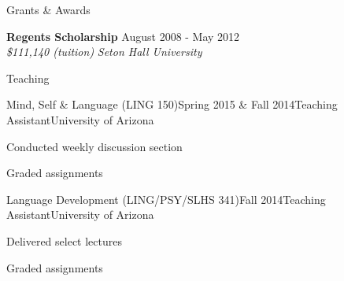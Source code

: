 \documentclass{resume} %
\begin{document}
\begin{minipage}{\textwidth}
\begin{rSection}{Grants \& Awards}

{\bf Regents Scholarship} \hfill {August 2008 - May 2012} \\ 
{\em \$111,140 (tuition)} \hfill {\em Seton Hall University} \\



\end{rSection}
\end{minipage}


\vspace{1.0cm}



\begin{rSection}{Teaching}

\begin{rSubsection}{Mind, Self \& Language (LING 150)}{Spring 2015 \& Fall 2014}{Teaching Assistant}{University of Arizona}
\item Conducted weekly discussion section
\item Graded assignments
\end{rSubsection}

\begin{rSubsection}{Language Development (LING/PSY/SLHS 341)}{Fall 2014}{Teaching Assistant}{University of Arizona}
\item Delivered select lectures
\item Graded assignments
\end{rSubsection}

\end{rSection}



\end{document}
